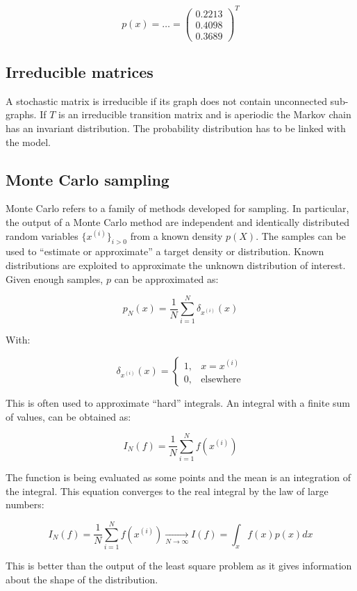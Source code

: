   $$p(x)=\dots = \begin{pmatrix} 0.2213 \\ 0.4098 \\ 0.3689\end{pmatrix}^T$$

  \subsection{Irreducible matrices}
  A stochastic matrix is irreducible if its graph does not contain unconnected sub-graphs.
  If $T$ is an irreducible transition matrix and is aperiodic the Markov chain has an invariant distribution.
  The probability distribution has to be linked with the model.

  \subsection{Monte Carlo sampling}
  Monte Carlo refers to a family of methods developed for sampling.
  In particular, the output of a Monte Carlo method are independent and identically distributed random variables $\{x^{(i)}\}_{i>0}$ from a known density $p(X)$.
  The samples can be used to ``estimate or approximate'' a target density or distribution.
  Known distributions are exploited to approximate the unknown distribution of interest.
  Given enough samples, $p$ can be approximated as:

  $$p_N(x)= \frac{1}{N}\sum^N_{i=1}\delta_{x^{(i)}}(x)$$

  With:

  $$\delta_{x^{(i)}}(x)= \begin{cases}1, & x=x^{(i)} \\ 0, & \text{elsewhere}\end{cases}$$

  This is often used to approximate ``hard'' integrals.
  An integral with a finite sum of values, can be obtained as:

  $$I_N(f)=\frac{1}{N} \sum^N_{i=1} f(x^{(i)})$$

  The function is being evaluated as some points and the mean is an integration of the integral.
  This equation converges to the real integral by the law of large numbers:

  $$I_N(f)=\frac{1}{N} \sum^N_{i=1} f(x^{(i)})  \xrightarrow[N \rightarrow \infty  ]{}   I(f)= \int_x f(x)p(x)dx$$

  This is better than the output of the least square problem as it gives information about the shape of the distribution.

